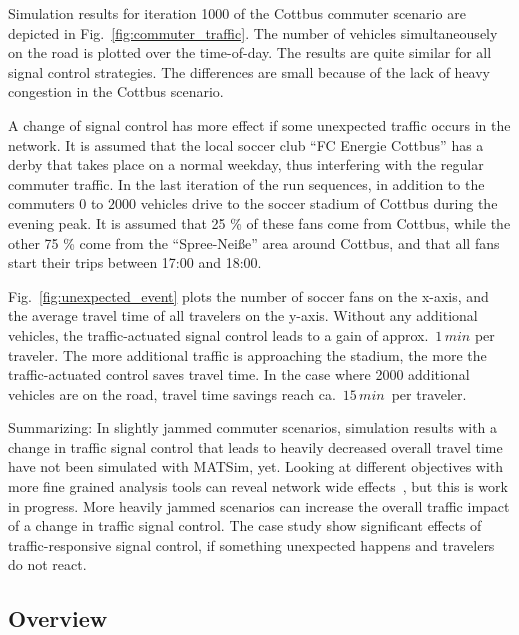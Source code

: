 Simulation results for iteration 1000 of the Cottbus commuter scenario are depicted in
Fig.~\ref{fig:commuter_traffic}. 
The number of vehicles simultaneousely on the road is plotted over the time-of-day. 
The results are quite similar for all signal control strategies. 
The differences are small because of the lack of heavy congestion in the Cottbus scenario. 

A change of signal control has more effect if some unexpected traffic occurs in the network. 
It is assumed that the local soccer club ``FC Energie Cottbus'' has a derby that takes place on a normal weekday, thus interfering with the regular commuter traffic. 
In the last iteration of the run sequences, in addition to the commuters $0$ to $2000$ vehicles drive to the soccer stadium of Cottbus during the evening peak. 
It is assumed that 25 \% of these fans come from Cottbus,
while the other 75 \% come from the ``Spree-Nei{\ss}e'' area around Cottbus, and that all fans start their trips between 17:00 and 18:00. 

Fig.~\ref{fig:unexpected_event} plots the number of soccer fans on
the x-axis, and the average travel time of all travelers on the
y-axis. Without any additional vehicles,
the traffic-actuated signal control leads to a gain of
approx.~$1 \, min$ per traveler.
The more additional traffic is approaching the stadium, the more the traffic-actuated control saves travel time. In the case where 2000 additional vehicles are on the road, travel time savings reach ca.~$15\, min$~per traveler. 

Summarizing: In slightly jammed commuter scenarios, simulation results with a change in traffic signal control that leads to heavily decreased overall travel time have not been simulated with MATSim, yet. 
Looking at different objectives with more fine grained analysis tools can reveal network wide effects~\citep[e.g.~see the analysis using macroscopic fundamental diagrams, pp.114]{Grether2014PhD}, but this is work in progress.  
More heavily jammed scenarios can increase the overall traffic impact of a change in traffic signal control. The case study show significant effects of traffic-responsive signal control, if something unexpected happens and travelers do not react.  

\subsection{Overview}

